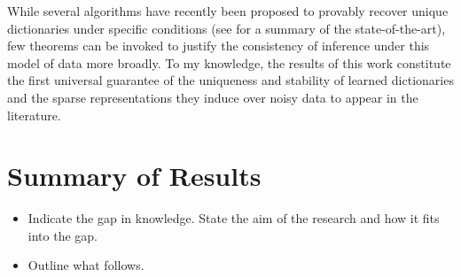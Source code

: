 While several algorithms have recently been proposed to provably recover unique dictionaries under specific conditions (see \cite[Sec.~I-E]{Sun16} for a summary of the state-of-the-art), few theorems can be invoked to justify the consistency of inference under this model of data more broadly. To my knowledge, the results of this work constitute the first  universal guarantee of the uniqueness and stability of learned dictionaries and the sparse representations they induce over noisy data to appear in the literature.

\section{Summary of Results}



\begin{itemize}
\item Indicate the gap in knowledge. State the aim of the research and how it fits into the gap.
\item Outline what follows.
\end{itemize}